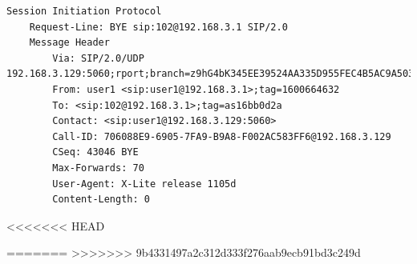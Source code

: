 \documentclass[12pt,a4paper,notitlepage]{article}
\begin{document}
\begin{lstlisting}[title=Contenu d'un paquet BYE]
Session Initiation Protocol
    Request-Line: BYE sip:102@192.168.3.1 SIP/2.0
    Message Header
        Via: SIP/2.0/UDP 192.168.3.129:5060;rport;branch=z9hG4bK345EE39524AA335D955FEC4B5AC9A503
        From: user1 <sip:user1@192.168.3.1>;tag=1600664632
        To: <sip:102@192.168.3.1>;tag=as16bb0d2a
        Contact: <sip:user1@192.168.3.129:5060>
        Call-ID: 706088E9-6905-7FA9-B9A8-F002AC583FF6@192.168.3.129
        CSeq: 43046 BYE
        Max-Forwards: 70
        User-Agent: X-Lite release 1105d
        Content-Length: 0
\end{lstlisting}

<<<<<<< HEAD






=======
>>>>>>> 9b4331497a2c312d333f276aab9ecb91bd3c249d
\end{document}
